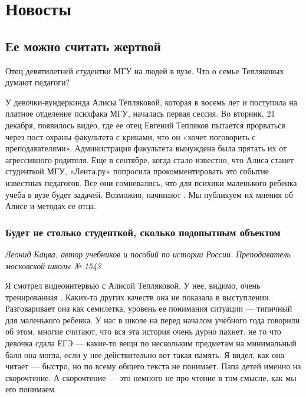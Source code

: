 
\chapter{Новосты}

\section{Ее можно считать жертвой}
Отец девятилетней студентки МГУ  на людей в вузе. Что о семье Тепляковых думают педагоги?

У девочки-вундеркинда Алисы Тепляковой, которая в восемь лет  и поступила на платное отделение психфака МГУ, началась первая сессия. Во вторник, 21 декабря, появилось видео, где ее отец Евгений Тепляков пытается прорваться через пост охраны факультета с криками, что он «хочет поговорить с преподавателями». Администрация факультета вынуждена была прятать их от агрессивного родителя. Еще в сентябре, когда стало известно, что Алиса станет студенткой МГУ, «Лента.ру» попросила прокомментировать это событие известных педагогов. Все они сомневались, что для психики маленького ребенка учеба в вузе будет  задачей. Возможно,  начинают . Мы публикуем их мнения об Алисе и методах ее отца.

\subsection{Будет не столько студенткой, сколько подопытным объектом}
\textit{Леонид Кацва, автор учебников и пособий по истории России. Преподаватель московской школы № 1543}

Я смотрел видеоинтервью с Алисой Тепляковой. У нее, видимо, очень тренированная . Каких-то других качеств она не показала в выступлении. Разговаривает она как семилетка, уровень ее понимания ситуации --- типичный для маленького ребенка. У нас в школе на  перед началом учебного года говорили об этом, многие считают, что вся эта история очень дурно пахнет.  не то что девочка сдала ЕГЭ ---  какие-то вещи по нескольким предметам на минимальный балл она могла, если у нее действительно вот такая память. Я видел, как она читает --- быстро, но  по всему общего  текста не понимает. Папа  детей именно на скорочтение. А скорочтение --- это немного не про чтение в том смысле, как мы его понимаем.

